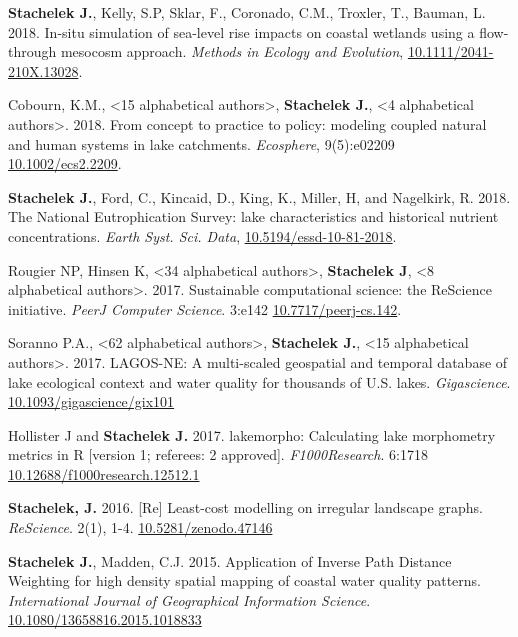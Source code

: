 \documentclass[11pt]{article}
\makeatletter
\newlength{\bibhang}
\newlength{\bibsep}
 {\@listi \global\bibsep\itemsep \global\advance\bibsep by\parsep}
\newenvironment{bibenum*}
  {\renewcommand\labelenumi{[\theenumi]}%
   \etaremune[
     topsep=0pt,
     itemsep=\bibsep,
     parsep=0pt,partopsep=0pt,
     itemindent=-\bibhang,
     leftmargin={\bibhang+\widthof{[999]}}]}
  {\endetaremune}
\makeatother
\begin{document}
\begin{bibenum*}
  \item \textbf{Stachelek J.}, Kelly, S.P, Sklar, F., Coronado, C.M., Troxler, T., Bauman, L. 2018. In-situ simulation of sea-level rise impacts on coastal wetlands using a flow-through mesocosm approach. \emph{Methods in Ecology and Evolution}, \href{https://doi.org/10.1111/2041-210X.13028}{10.1111/2041-210X.13028}.

  \item Cobourn, K.M., <15 alphabetical authors>, \textbf{Stachelek J.}, <4 alphabetical authors>. 2018. From concept to practice to policy: modeling coupled natural and human systems in lake catchments. \emph{Ecosphere}, 9(5):e02209 \href{https://doi.org/10.1002/ecs2.2209}{10.1002/ecs2.2209}.

  \item \textbf{Stachelek J.}, Ford, C., Kincaid, D., King, K., Miller, H, and Nagelkirk, R. 2018. The National Eutrophication Survey: lake characteristics and historical nutrient concentrations. \emph{Earth Syst. Sci. Data}, \href{https://doi.org/10.5194/essd-10-81-2018}{10.5194/essd-10-81-2018}.

    \item Rougier NP, Hinsen K, <34 alphabetical authors>, \textbf{Stachelek J}, <8 alphabetical authors>. 2017. Sustainable computational science: the ReScience initiative. \emph{PeerJ Computer Science}. 3:e142 \href{https://doi.org/10.7717/peerj-cs.142}{10.7717/peerj-cs.142}.

    \item Soranno P.A., <62 alphabetical authors>, \textbf{Stachelek J.}, <15 alphabetical authors>. 2017. LAGOS-NE: A multi-scaled geospatial and temporal database of lake ecological context and water quality for thousands of U.S. lakes. \emph{Gigascience}. \href{https://doi.org/10.1093/gigascience/gix101}{10.1093/gigascience/gix101}
    
    \item Hollister J and \textbf{Stachelek J.} 2017. lakemorpho: Calculating lake morphometry metrics in R [version 1; referees: 2 approved]. \emph{F1000Research}. 6:1718 \href{https://doi.org/10.12688/f1000research.12512.1}{10.12688/f1000research.12512.1}

    \item \textbf{Stachelek, J.} 2016. [Re] Least-cost modelling on irregular landscape graphs. \emph{ReScience}. 2(1), 1-4. \href{https://jsta.rbind.io/pdf/2016_stachelek_rescience.pdf}{10.5281/zenodo.47146}
   
    \item \textbf{Stachelek J.}, Madden, C.J. 2015. Application of Inverse Path Distance Weighting for high density spatial mapping of coastal water quality patterns. \emph{International Journal of Geographical Information Science}. \href{https://jsta.rbind.io/pdf/stachmadden2015am.pdf}{10.1080/13658816.2015.1018833}
   

\end{bibenum*}
\end{document}
